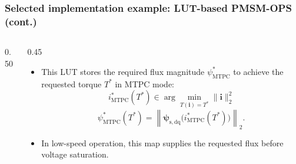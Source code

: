 \begin{frame}
    \frametitle{Selected implementation example: LUT-based PMSM-OPS (cont.)}
    \begin{columns}[c,onlytextwidth]
        \begin{column}{0.50\textwidth}
            \begin{center}
            \end{center}
        \end{column}
        \begin{column}{0.45\textwidth}
            \begin{itemize}
                \item This LUT stores the required flux magnitude $\psi^*_{\mathrm{MTPC}}$ to achieve the requested torque $T^*$ in MTPC mode:
                      $$
                          i^*_{\mathrm{MTPC}}(T^*)
                          \in
                          \arg\min_{T(\bm{i})=T^*}\|\bm{i}\|_2^2
                      $$
                      $$
                          \psi^*_{\mathrm{MTPC}}(T^*)
                          =
                          \left\|\bm{\psi}_{\mathrm{s,dq}}\bigl(i^*_{\mathrm{MTPC}}(T^*)\bigr)\right\|_2 .
                      $$
                \item In low-speed operation, this map supplies the requested flux before voltage saturation.
            \end{itemize}
        \end{column}
    \end{columns}
\end{frame}

